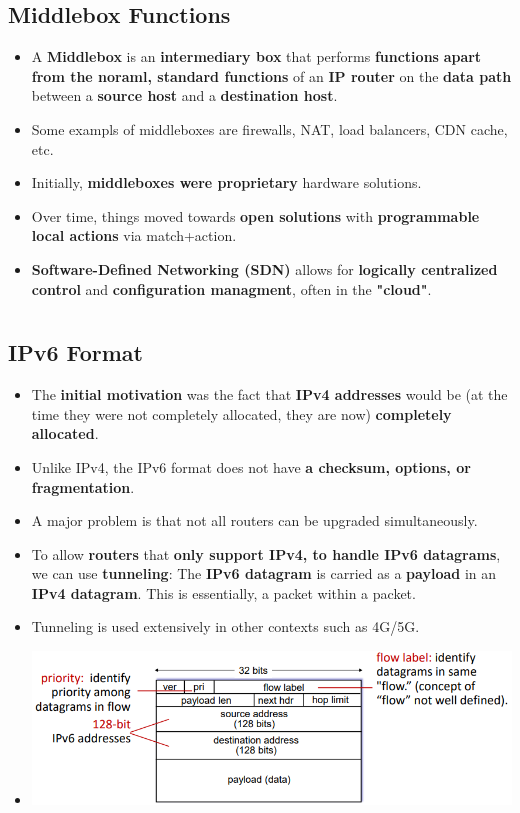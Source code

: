 \documentclass{article}
\begin{document}
    \subsection*{Middlebox Functions}
    \begin{itemize}
        \item A \textbf{Middlebox} is an \textbf{intermediary box} that performs \textbf{functions} \textbf{apart from the noraml, standard functions} of an \textbf{IP router} on the \textbf{data path} between a \textbf{source host} and a \textbf{destination host}.
        \item Some exampls of middleboxes are firewalls, NAT, load balancers, CDN cache, etc.
        \item Initially, \textbf{middleboxes were proprietary} hardware solutions.
        \item Over time, things moved towards \textbf{open solutions} with \textbf{programmable local actions} via match+action.
        \item \textbf{Software-Defined Networking (SDN)} allows for \textbf{logically centralized control} and \textbf{configuration managment}, often in the \textbf{"cloud"}.
    \end{itemize}

    \section*{}
    
    \subsection*{IPv6 Format}
    \begin{itemize}
        \item The \textbf{initial motivation} was the fact that \textbf{IPv4 addresses} would be (at the time they were not completely allocated, they are now) \textbf{completely allocated}.
        \item Unlike IPv4, the IPv6 format does not have \textbf{a checksum, options, or fragmentation}.
        \item A major problem is that not all routers can be upgraded simultaneously.
        \item To allow \textbf{routers} that \textbf{only support IPv4, to handle IPv6 datagrams}, we can use \textbf{tunneling}: The \textbf{IPv6 datagram} is carried as a \textbf{payload} in an \textbf{IPv4 datagram}. This is essentially, a packet within a packet.
        \item Tunneling is used extensively in other contexts such as 4G/5G.
        \item[] \includegraphics*[width=\textwidth - 25pt]{images/IPv6-Format.PNG}
    \end{itemize}
    
\end{document}
